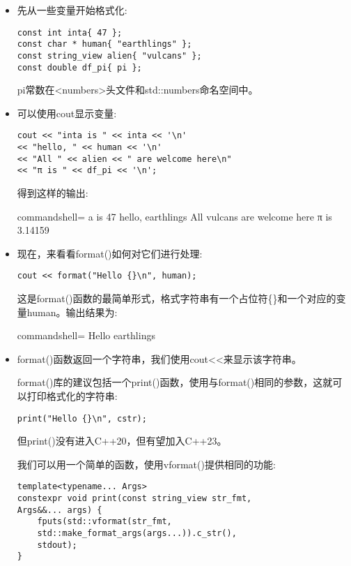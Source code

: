 \begin{itemize}
\item 
先从一些变量开始格式化:

\begin{lstlisting}[style=styleCXX]
const int inta{ 47 };
const char * human{ "earthlings" };
const string_view alien{ "vulcans" };
const double df_pi{ pi };
\end{lstlisting}

pi常数在<numbers>头文件和std::numbers命名空间中。

\item 
可以使用cout显示变量:

\begin{lstlisting}[style=styleCXX]
cout << "inta is " << inta << '\n'
<< "hello, " << human << '\n'
<< "All " << alien << " are welcome here\n"
<< "π is " << df_pi << '\n';
\end{lstlisting}

得到这样的输出:

\begin{tcblisting}{commandshell={}}
a is 47
hello, earthlings
All vulcans are welcome here
π is 3.14159
\end{tcblisting}

\item 
现在，来看看format()如何对它们进行处理:

\begin{lstlisting}[style=styleCXX]
cout << format("Hello {}\n", human);
\end{lstlisting}

这是format()函数的最简单形式，格式字符串有一个占位符\{\}和一个对应的变量human。输出结果为:

\begin{tcblisting}{commandshell={}}
Hello earthlings
\end{tcblisting}

\item 
format()函数返回一个字符串，我们使用cout<{}<来显示该字符串。

format()库的建议包括一个print()函数，使用与format()相同的参数，这就可以打印格式化的字符串:

\begin{lstlisting}[style=styleCXX]
print("Hello {}\n", cstr);
\end{lstlisting}

但print()没有进入C++20，但有望加入C++23。

我们可以用一个简单的函数，使用vformat()提供相同的功能:

\begin{lstlisting}[style=styleCXX]
template<typename... Args>
constexpr void print(const string_view str_fmt,
Args&&... args) {
	fputs(std::vformat(str_fmt,
	std::make_format_args(args...)).c_str(),
	stdout);
}
\end{lstlisting}


\end{itemize}
